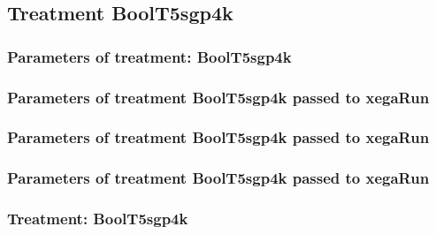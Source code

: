 \documentclass[18pt,c]{beamer}
\begin{document}
\clearpage
\subsection{Treatment BoolT5sgp4k}

 \begin{frame}
 \fontsize{8pt}{9pt}\selectfont
 \frametitle{  Parameters of treatment: BoolT5sgp4k 
 }

 \label{ExpFtParmTable020.tex}  
 \end{frame}


 \begin{frame}
 \fontsize{8pt}{9pt}\selectfont
 \frametitle{  Parameters of treatment BoolT5sgp4k passed to xegaRun
 }

 \label{ExpFtParmTable021.tex}  
 \end{frame}


 \begin{frame}
 \fontsize{8pt}{9pt}\selectfont
 \frametitle{  Parameters of treatment BoolT5sgp4k passed to xegaRun
 }

 \label{ExpFtParmTable022.tex}  
 \end{frame}


 \begin{frame}
 \fontsize{8pt}{9pt}\selectfont
 \frametitle{  Parameters of treatment BoolT5sgp4k passed to xegaRun
 }

 \label{ExpFtParmTable023.tex}  
 \end{frame}

 \begin{frame}
 \fontsize{8pt}{9pt}\selectfont
 \frametitle{ Treatment: BoolT5sgp4k }

 \label{ExpFStatsTable008.tex}  
 \end{frame}
\end{document}
